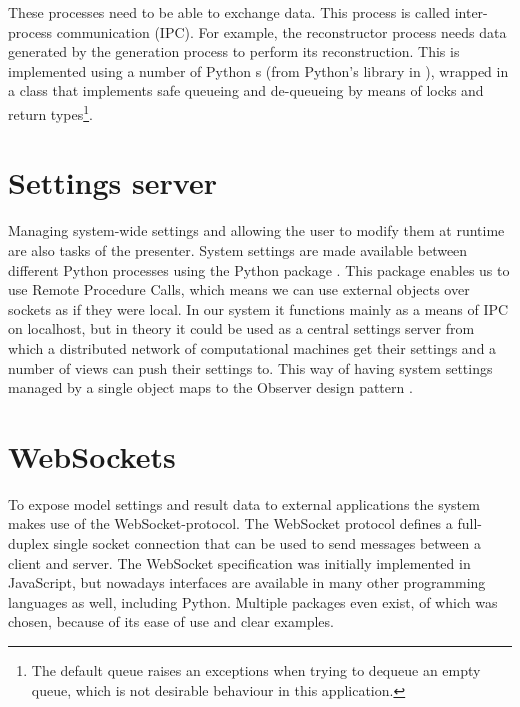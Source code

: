 \documentclass[a4paper, openany, oneside]{memoir}
\begin{document}
These processes need to be able to exchange data. This process is called inter-process communication (IPC). For example, the reconstructor process needs data generated by the generation process to perform its reconstruction. This is implemented using a number of Python s (from Python's  library in \cite{pythonref}), wrapped in a class that implements safe queueing and de-queueing by means of locks and  return types\footnote{The default queue raises an exceptions when trying to dequeue an empty queue, which is not desirable behaviour in this application.}.

\section{Settings server}
\label{sec:settings_server}
Managing system-wide settings and allowing the user to modify them at runtime are also tasks of the presenter. System settings are made available between different Python processes using the Python package . This package enables us to use Remote Procedure Calls, which means we can use external objects over sockets as if they were local. In our system it functions mainly as a means of IPC on localhost, but in theory it could be used as a central settings server from which a distributed network of computational machines get their settings and a number of views can push their settings to. This way of having system settings managed by a single object maps to the Observer design pattern \cite{msdn-observer}.

\section{WebSockets}
\label{sec:websockets}
To expose model settings and result data to external applications the system makes use of the WebSocket-protocol. The WebSocket protocol defines a full-duplex single socket connection that can be used to send messages between a client and server. The WebSocket specification was initially implemented in JavaScript, but nowadays interfaces are available in many other programming languages as well, including Python. Multiple packages even exist, of which  was chosen, because of its ease of use and clear examples.
\end{document}
